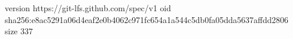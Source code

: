 version https://git-lfs.github.com/spec/v1
oid sha256:e8ac5291a06d4eaf2e0b4062c971fc654a1a544c5db0fa05dda5637affdd2806
size 337
